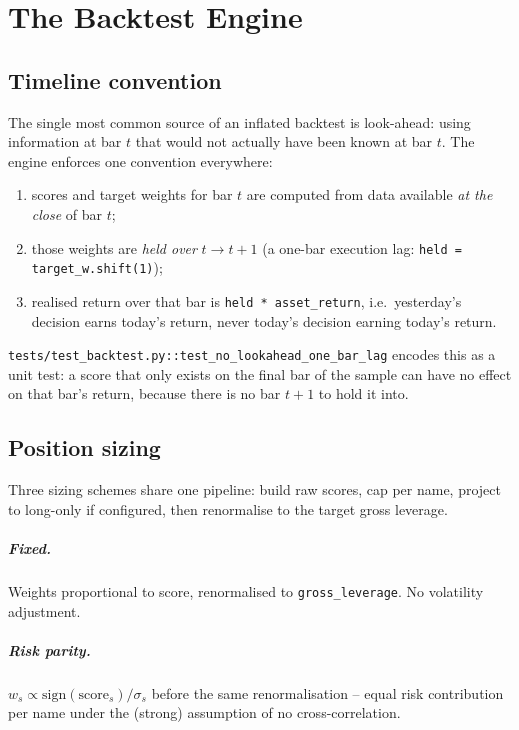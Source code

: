 \chapter{The Backtest Engine}

\section{Timeline convention}

The single most common source of an inflated backtest is look-ahead: using
information at bar $t$ that would not actually have been known at bar $t$. The
engine enforces one convention everywhere:

\begin{enumerate}
  \item scores and target weights for bar $t$ are computed from data available
  \emph{at the close} of bar $t$;
  \item those weights are \emph{held over} $t \to t+1$ (a one-bar execution lag:
  \texttt{held = target\_w.shift(1)});
  \item realised return over that bar is \texttt{held * asset\_return}, i.e.\
  yesterday's decision earns today's return, never today's decision earning
  today's return.
\end{enumerate}

\texttt{tests/test\_backtest.py::test\_no\_lookahead\_one\_bar\_lag} encodes this
as a unit test: a score that only exists on the final bar of the sample can
have no effect on that bar's return, because there is no bar $t+1$ to hold it
into.

\section{Position sizing}

Three sizing schemes share one pipeline: build raw scores, cap per name, project
to long-only if configured, then renormalise to the target gross leverage.

\paragraph{Fixed.} Weights proportional to score, renormalised to
\texttt{gross\_leverage}. No volatility adjustment.

\paragraph{Risk parity.} $w_s \propto \mathrm{sign}(\text{score}_s)/\sigma_s$
before the same renormalisation -- equal risk contribution per name under the
(strong) assumption of no cross-correlation.

